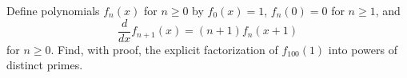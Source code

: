 Define polynomials $f_n(x)$ for $n \geq 0$ by $f_0(x)=1$, $f_n(0)=0$
for $n \geq 1$, and
\[
\frac{d}{dx} f_{n+1}(x) = (n+1)f_n(x+1)
\]
for $n \geq 0$. Find, with proof, the explicit factorization of
$f_{100}(1)$ into powers of distinct primes.
